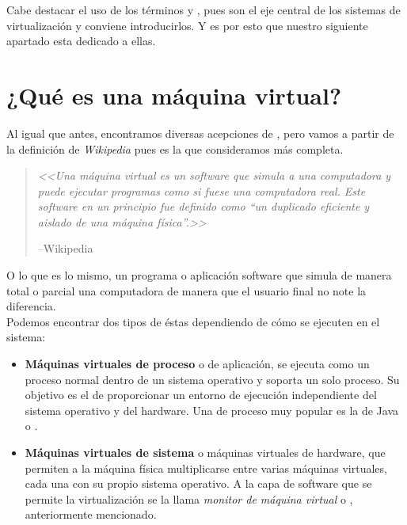 Cabe destacar el uso de los términos \emph{} y , pues son el eje central de los sistemas de virtualización y conviene introducirlos. Y es por esto que nuestro siguiente apartado esta dedicado a ellas.

\section{¿Qué es una máquina virtual?}

Al igual que antes, encontramos diversas acepciones de \emph{}, pero vamos a partir de la definición de \emph{Wikipedia} pues es la que consideramos más completa.

\begin{quote}
\emph{<<Una máquina virtual es un software que simula a una computadora y puede ejecutar programas como si fuese una computadora real. Este software en un principio fue definido como \textquotedblleft un duplicado eficiente y aislado de una máquina física\textquotedblright.>>}
\begin{flushright}
--Wikipedia\cite{defmaqvirwiki}
\end{flushright}
\end{quote}

O lo que es lo mismo, un programa o aplicación software que simula de manera total o parcial una computadora de manera que el usuario final no note la diferencia.\\

Podemos encontrar dos tipos de éstas dependiendo de cómo se ejecuten en el sistema:

\begin{itemize}
\item \textbf{Máquinas virtuales de proceso} o  de aplicación, se ejecuta como un proceso normal dentro de un sistema operativo y soporta un solo proceso. Su objetivo es el de proporcionar un entorno de ejecución independiente del sistema operativo y del hardware. Una  de proceso muy popular es la de Java o \emph{}.
\item \textbf{Máquinas virtuales de sistema} o máquinas virtuales de hardware, que permiten a la máquina física multiplicarse entre varias máquinas virtuales, cada una con su propio sistema operativo. A la capa de software que se permite la virtualización se la llama \emph{monitor de máquina virtual} o , anteriormente mencionado.
\end{itemize}

